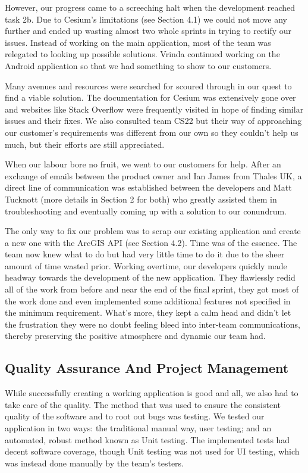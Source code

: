 \documentclass{l3proj}
\begin{document}
However, our progress came to a screeching halt when the development reached task 2b. Due to Cesium’s limitations (see Section 4.1) we could not move any further and ended up wasting almost two whole sprints in trying to rectify our issues. Instead of working on the main application, most of the team was relegated to looking up possible solutions. Vrinda continued working on the Android application so that we had something to show to our customers.

Many avenues and resources were searched for scoured through in our quest to find a viable solution. The documentation for Cesium was extensively gone over and websites like Stack Overflow were frequently visited in hope of finding similar issues and their fixes. We also consulted team CS22 but their way of approaching our customer’s requirements was different from our own so they couldn’t help us much, but their efforts are still appreciated.

When our labour bore no fruit, we went to our customers for help. After an exchange of emails between the product owner and Ian James from Thales UK, a direct line of communication was established between the developers and Matt Tucknott (more details in Section 2 for both) who greatly assisted them in troubleshooting and eventually coming up with a solution to our conundrum.

The only way to fix our problem was to scrap our existing application and create a new one with the ArcGIS API (see Section 4.2). Time was of the essence. The team now knew what to do but had very little time to do it due to the sheer amount of time wasted prior. Working overtime, our developers quickly made headway towards the development of the new application. They flawlessly redid all of the work from before and near the end of the final sprint, they got most of the work done and even implemented some additional features not specified in the minimum requirement. What’s more, they kept a calm head and didn’t let the frustration they were no doubt feeling bleed into inter-team communications, thereby preserving the positive atmosphere and dynamic our team had.

\subsection{Quality Assurance And Project Management}
 
While successfully creating a working application is good and all, we also had to take care of the quality. The method that was used to ensure the consistent quality of the software and to root out bugs was testing. We tested our application in two ways: the traditional manual way, user testing; and an automated, robust method known as Unit testing\cite{unit}. The implemented tests had decent software coverage, though Unit testing was not used for UI testing\cite{uitest}, which was instead done manually by the team's testers.
\end{document}
